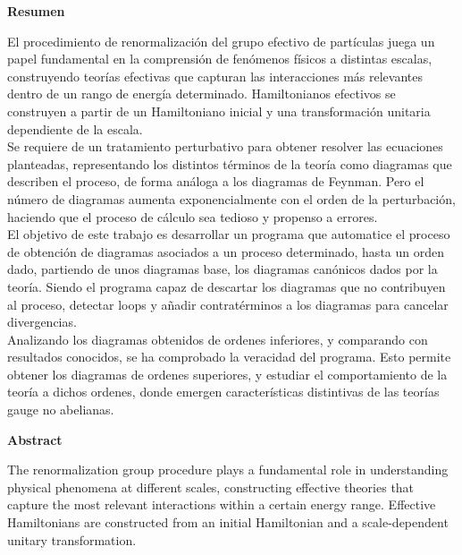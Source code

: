 \documentclass[11pt,a4paper,twoside,pdf]{article}
\numberwithin{equation}{section}
\begin{document}
\newpage
%
\begin{center}
{\bf Resumen}
\bigskip

\begin{minipage}{0.8\linewidth}

El procedimiento de renormalización del grupo efectivo de partículas juega un papel fundamental
en la comprensión de fenómenos físicos a distintas escalas, construyendo teorías efectivas que
capturan las interacciones más relevantes dentro de un rango de energía determinado.
Hamiltonianos efectivos se construyen a partir de un Hamiltoniano inicial y una transformación
unitaria dependiente de la escala.\\

Se requiere de un tratamiento perturbativo para obtener
resolver las ecuaciones planteadas, representando los distintos términos de la teoría como diagramas 
que describen el proceso, de forma análoga a los diagramas de Feynman. Pero el número de
diagramas aumenta exponencialmente con el orden de la perturbación, haciendo que
el proceso de cálculo sea tedioso y propenso a errores. \\

El objetivo de este trabajo es desarrollar un programa \cite{Liu_Computational_tools_for_2025} que automatice el proceso
de obtención de diagramas asociados a un proceso determinado, hasta un orden
dado, partiendo de unos diagramas base, los diagramas canónicos dados por la 
teoría. Siendo el programa capaz de descartar los diagramas que no contribuyen al 
proceso, detectar loops y añadir contratérminos a los diagramas para cancelar 
divergencias. \\

Analizando los diagramas obtenidos de ordenes inferiores, y comparando con 
resultados conocidos, se ha comprobado la veracidad del programa. Esto permite
obtener los diagramas de ordenes superiores, y estudiar el comportamiento de la 
teoría a dichos ordenes, donde emergen características distintivas de las teorías gauge no abelianas.

\end{minipage}

\newpage

{\bf Abstract} 
\bigskip

\begin{minipage}{0.8\linewidth}
The renormalization group procedure plays a fundamental role in understanding
physical phenomena at different scales, constructing effective theories that
capture the most relevant interactions within a certain energy range.
Effective Hamiltonians are constructed from an initial Hamiltonian and a scale-dependent
unitary transformation.\\


\end{minipage}
\end{center}
\end{document}
